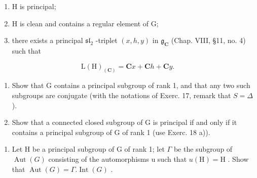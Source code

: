 \begin{enumerate}
\def\labelenumi{(\roman{enumi})}
\item
  H is principal;
\item
  H is clean and contains a regular element of G;
\item
  there exists a principal \(\mathfrak{sl}_2\) -triplet \((x,h,y)\) in \(\mathfrak{g}_{\mathbf{C}}\) (Chap. VIII, §11, no. 4) such that
\end{enumerate}

\[
\mathrm{L} (\mathrm{H}) _ {(\mathbf {C})} = \mathbf {C} x + \mathbf {C} h + \mathbf {C} y.
\]

\begin{enumerate}
\def\labelenumi{\alph{enumi})}
\setcounter{enumi}{1}
\item
  Show that G contains a principal subgroup of rank 1, and that any two such subgroups are conjugate (with the notations of Exerc. 17, remark that \(S = \Delta\) ).
\item
  Show that a connected closed subgroup of G is principal if and only if it contains a principal subgroup of G of rank 1 (use Exerc. 18 a)).
\end{enumerate}

\begin{enumerate}
\def\labelenumi{\arabic{enumi})}
\setcounter{enumi}{21}
\item
  Let H be a principal subgroup of G of rank 1; let \(\Gamma\) be the subgroup of \(\operatorname{Aut}(G)\) consisting of the automorphisms u such that \(u(\mathrm{H}) = \mathrm{H}\) . Show that \(\operatorname{Aut}(G) = \Gamma.\operatorname{Int}(G)\) .
\end{enumerate}

